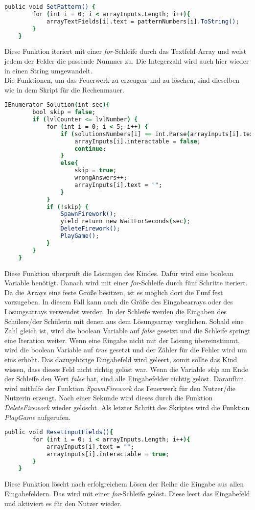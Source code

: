 \begin{lstlisting}[language=csh, caption={hideCircle.cs SetPattern-Funktion}]
	public void SetPattern() {
		for (int i = 0; i < arrayInputs.Length; i++){
			arrayTextFields[i].text = patternNumbers[i].ToString();
		}
	}
\end{lstlisting}
Diese Funktion iteriert mit einer \textit{for}-Schleife durch das Textfeld-Array und weist jedem der Felder die passende Nummer zu. Die Integerzahl wird auch hier wieder in einen String umgewandelt.\\
Die Funktionen, um das Feuerwerk zu erzeugen und zu löschen, sind dieselben wie in dem Skript für die Rechenmauer.\\ %
\begin{lstlisting}[language=csh, caption={hideCircle.cs Solution-Funktion}]
	IEnumerator Solution(int sec){
		bool skip = false;
		if (lvlCounter <= lvlNumber) {
			for (int i = 0; i < 5; i++) {
				if (solutionsNumbers[i] == int.Parse(arrayInputs[i].text)) {
					arrayInputs[i].interactable = false;
					continue;
				}
				else{
					skip = true;
					wrongAnswers++;
					arrayInputs[i].text = "";
				}
			}
			if (!skip) {
				SpawnFirework();
				yield return new WaitForSeconds(sec);
				DeleteFirework();
				PlayGame();
			}
		}
	}
\end{lstlisting}
Diese Funktion überprüft die Lösungen des Kindes. Dafür wird eine boolean Variable benötigt. Danach wird mit einer \textit{for}-Schleife durch fünf Schritte iteriert. Da die Arrays eine feste Größe besitzen, ist es möglich dort die Fünf fest vorzugeben. In diesem Fall kann auch die Größe des Eingabearrays oder des Lösungsarrays verwendet werden. In der Schleife werden die Eingaben des Schülers/der Schülerin mit denen aus dem Lösungsarray verglichen. Sobald eine Zahl gleich ist, wird die boolean Variable auf \textit{false} gesetzt und die Schleife springt eine Iteration weiter. Wenn eine Eingabe nicht mit der Lösung übereinstimmt, wird die boolean Variable auf \textit{true} gesetzt und der Zähler für die Fehler wird um eins erhöht. Das dazugehörige Eingabefeld wird geleert, somit sollte das Kind wissen, dass dieses Feld nicht richtig gelöst war. Wenn die Variable \textit{skip} am Ende der Schleife den Wert \textit{false} hat, sind alle Eingabefelder richtig gelöst. Daraufhin wird mithilfe der Funktion \textit{SpawnFirework} das Feuerwerk für den Nutzer/die Nutzerin erzeugt. Nach einer Sekunde wird dieses durch die Funktion \textit{DeleteFirework} wieder gelöscht. Als letzter Schritt des Skriptes wird die Funktion \textit{PlayGame} aufgerufen. \\
\begin{lstlisting}[language=csh, caption={hideCircle.cs ResetInputFields-Funktion}]
	public void ResetInputFields(){
		for (int i = 0; i < arrayInputs.Length; i++){
			arrayInputs[i].text = "";
			arrayInputs[i].interactable = true;
		}
	}
\end{lstlisting}
Diese Funktion löscht nach erfolgreichem Lösen der Reihe die Eingabe aus allen Eingabefeldern. Das wird mit einer \textit{for}-Schleife gelöst. Diese leert das Eingabefeld und aktiviert es für den Nutzer wieder.
